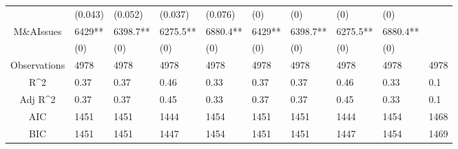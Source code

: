 \documentclass{article}
\begin{document}
\begin{table}[H]
\begin{tabular}{|clllllllll|}
   & (0.043) & (0.052) & (0.037) & (0.076) & (0) & (0) & (0) & (0) &  \\ 
  M\&AIssues & 6429** & 6398.7** & 6275.5** & 6880.4** & 6429** & 6398.7** & 6275.5** & 6880.4** &  \\ 
   & (0) & (0) & (0) & (0) & (0) & (0) & (0) & (0) &  \\ 
  \hline 
 Observations & 4978 & 4978 & 4978 & 4978 & 4978 & 4978 & 4978 & 4978 & 4978 \\ 
  R^2 & 0.37 & 0.37 & 0.46 & 0.33 & 0.37 & 0.37 & 0.46 & 0.33 & 0.1 \\ 
  Adj R^2 & 0.37 & 0.37 & 0.45 & 0.33 & 0.37 & 0.37 & 0.45 & 0.33 & 0.1 \\ 
  AIC & 1451 & 1451 & 1444 & 1454 & 1451 & 1451 & 1444 & 1454 & 1468 \\ 
  BIC & 1451 & 1451 & 1447 & 1454 & 1451 & 1451 & 1447 & 1454 & 1469 \\ 
   \hline
\end{tabular}
 
\end{table}
\end{document}
